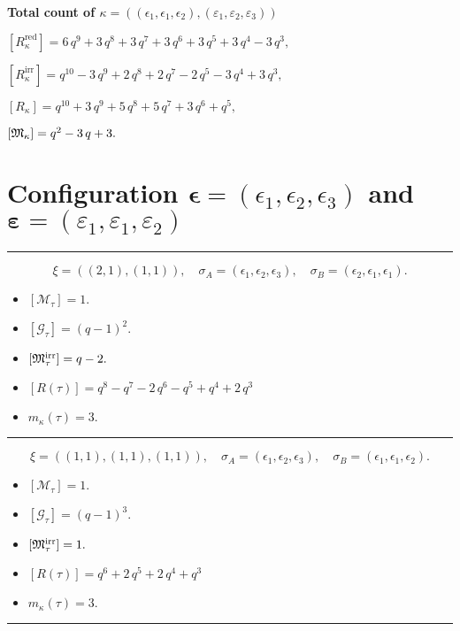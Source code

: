 \documentclass[10pt,a4paper]{amsart}
\begin{document}
\noindent\textbf{Total count of $\kappa = ((\epsilon_1,\epsilon_1,\epsilon_2), (\varepsilon_1,\varepsilon_2,\varepsilon_3))$}\medskip

${[R_{\kappa}^{\textrm{red}}]} = 6 \, q^{9} + 3 \, q^{8} + 3 \, q^{7} + 3 \, q^{6} + 3 \, q^{5} + 3 \, q^{4} - 3 \, q^{3} ,$

${[R_{\kappa}^{\textrm{irr}}]} = q^{10} - 3 \, q^{9} + 2 \, q^{8} + 2 \, q^{7} - 2 \, q^{5} - 3 \, q^{4} + 3 \, q^{3} ,$

${[R_{\kappa}]} = q^{10} + 3 \, q^{9} + 5 \, q^{8} + 5 \, q^{7} + 3 \, q^{6} + q^{5} ,$

${[{\frak M}_{\kappa}]} = q^{2} - 3 \, q + 3 .$

\newpage{}

\section{Configuration $\bm{\epsilon} = (\epsilon_1,\epsilon_2,\epsilon_3)$ and $\bm{\varepsilon} =(\varepsilon_1,\varepsilon_1,\varepsilon_2)$}
\noindent\rule{8cm}{0.4pt}

$$\xi = ({(2, 1), (1, 1)}),\quad \sigma_A = ({{\epsilon_1, \epsilon_2}, {\epsilon_3}}),\quad \sigma_B = ({{\epsilon_2, \epsilon_1}, {\epsilon_1}}).$$

\begin{itemize}
 \item $[\mathcal{M}_{\tau}] = 1 .$

 \item $[\mathcal{G}_{\tau}] = {\left(q - 1\right)}^{2} .$

 \item $[{\frak M}_{\tau}^{\textrm{irr}}] = q - 2 .$

 \item $[R(\tau)] = q^{8} - q^{7} - 2 \, q^{6} - q^{5} + q^{4} + 2 \, q^{3} $

 \item $m_{\kappa}(\tau) = 3 .$

 \end{itemize}
\noindent\rule{8cm}{0.4pt}

$$\xi = ({(1, 1), (1, 1), (1, 1)}),\quad \sigma_A = ({{\epsilon_1}, {\epsilon_2}, {\epsilon_3}}),\quad \sigma_B = ({{\epsilon_1}, {\epsilon_1}, {\epsilon_2}}).$$

\begin{itemize}
 \item $[\mathcal{M}_{\tau}] = 1 .$

 \item $[\mathcal{G}_{\tau}] = {\left(q - 1\right)}^{3} .$

 \item $[{\frak M}_{\tau}^{\textrm{irr}}] = 1 .$

 \item $[R(\tau)] = q^{6} + 2 \, q^{5} + 2 \, q^{4} + q^{3} $

 \item $m_{\kappa}(\tau) = 3 .$

 \end{itemize}
\noindent\rule{8cm}{0.4pt}
\end{document}
